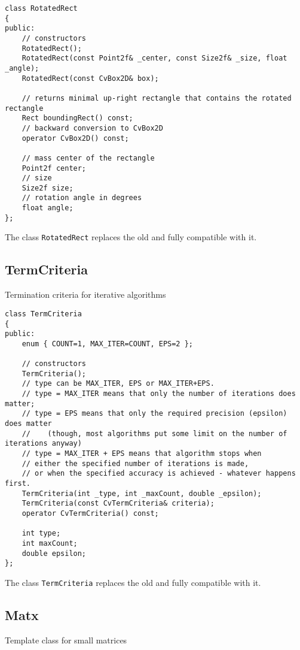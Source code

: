 \begin{lstlisting}
class RotatedRect
{
public:
    // constructors
    RotatedRect();
    RotatedRect(const Point2f& _center, const Size2f& _size, float _angle);
    RotatedRect(const CvBox2D& box);
    
    // returns minimal up-right rectangle that contains the rotated rectangle
    Rect boundingRect() const;
    // backward conversion to CvBox2D
    operator CvBox2D() const;
    
    // mass center of the rectangle
    Point2f center;
    // size
    Size2f size;
    // rotation angle in degrees
    float angle;
};
\end{lstlisting}

The class \texttt{RotatedRect} replaces the old  and fully compatible with it.

\subsection{TermCriteria}\label{TermCriteria}

Termination criteria for iterative algorithms

\begin{lstlisting}
class TermCriteria
{
public:
    enum { COUNT=1, MAX_ITER=COUNT, EPS=2 };

    // constructors
    TermCriteria();
    // type can be MAX_ITER, EPS or MAX_ITER+EPS.
    // type = MAX_ITER means that only the number of iterations does matter;
    // type = EPS means that only the required precision (epsilon) does matter
    //    (though, most algorithms put some limit on the number of iterations anyway)
    // type = MAX_ITER + EPS means that algorithm stops when
    // either the specified number of iterations is made,
    // or when the specified accuracy is achieved - whatever happens first.
    TermCriteria(int _type, int _maxCount, double _epsilon);
    TermCriteria(const CvTermCriteria& criteria);
    operator CvTermCriteria() const;

    int type;
    int maxCount;
    double epsilon;
};
\end{lstlisting}

The class \texttt{TermCriteria} replaces the old  and fully compatible with it.


\subsection{Matx}\label{Matx}
Template class for small matrices

